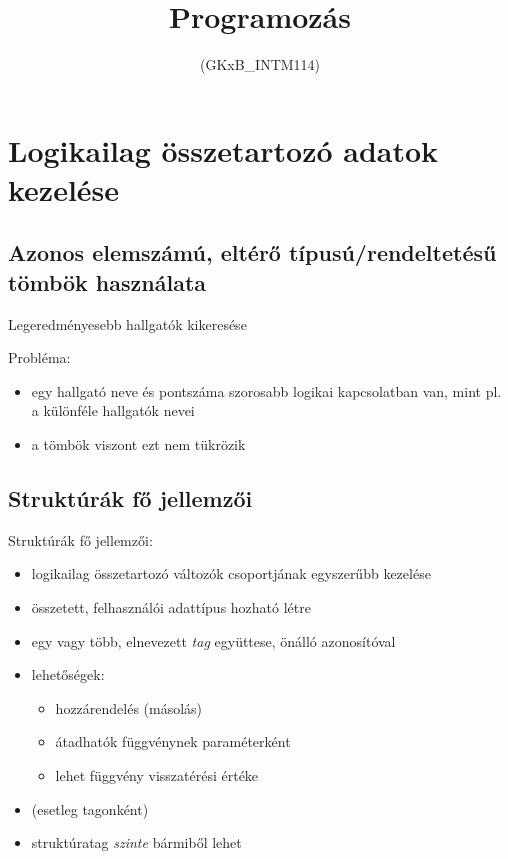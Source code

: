 \documentclass[usenames,dvipsnames,aspectratio=169]{beamer}
\title[5. előadás]{Programozás}
\subtitle{(GKxB\_INTM114)}
\begin{document}
\begin{frame}[plain]
  \titlepage
  \logoalul
\end{frame}

\section{Logikailag összetartozó adatok kezelése}
\subsection{Azonos elemszámú, eltérő típusú/rendeltetésű tömbök használata}
\begin{frame}
  \begin{exampleblock}{ Legeredményesebb hallgatók kikeresése}
    \scriptsize
    
  \end{exampleblock}
\end{frame}

\begin{frame}
  \begin{exampleblock}{}
    \scriptsize
    
  \end{exampleblock}
  \vfill
  Probléma:
  \begin{itemize}
    \item egy hallgató neve és pontszáma szorosabb logikai kapcsolatban van, mint pl. a különféle hallgatók nevei
    \item a tömbök viszont ezt nem tükrözik
  \end{itemize}
\end{frame}

\subsection{Struktúrák fő jellemzői}
\begin{frame}
  Struktúrák fő jellemzői:
  \begin{itemize}
    \item logikailag összetartozó változók csoportjának egyszerűbb kezelése
    \item összetett, felhasználói adattípus hozható létre
    \item egy vagy több, elnevezett \emph{tag} együttese, önálló azonosítóval
    \item lehetőségek:
    \begin{itemize}
      \item hozzárendelés (másolás)
      \item átadhatók függvénynek paraméterként
      \item lehet függvény visszatérési értéke
    \end{itemize}
    \item {} (esetleg tagonként)
    \item struktúratag \emph{szinte} bármiből lehet
  \end{itemize}
\end{frame}
\end{document}
